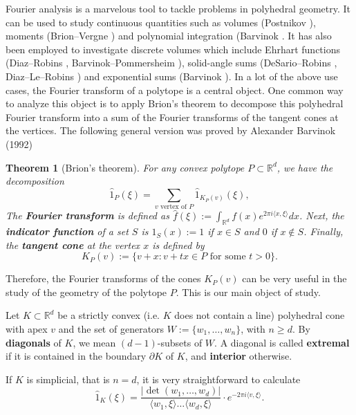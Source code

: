 \documentclass{article}
\newtheorem{thm}{Theorem}
\begin{document}
Fourier analysis is a marvelous tool to tackle problems in polyhedral geometry. It can be used to study continuous quantities such as volumes (Postnikov \cite{postnikov2009permutohedra}), moments (Brion--Vergne \cite{brion1997residue}) and polynomial integration (Barvinok \cite{barvinok1992exponential}. It has also been employed to investigate discrete volumes which include Ehrhart functions (Diaz--Robins \cite{diaz1997ehrhart}, Barvinok--Pommersheim \cite{barvinok1999algorithmic}), solid-angle sums (DeSario--Robins \cite{desario2011generalized}, Diaz--Le--Robins \cite{diaz1602fourier}) and exponential sums (Barvinok \cite{barvinok1993computing}). In a lot of the above use cases, the Fourier transform of a polytope is a central object. One common way to analyze this object is to apply Brion's theorem to decompose this polyhedral Fourier transform into a sum of the Fourier transforms of the tangent cones at the vertices. The following general version was proved by Alexander Barvinok (1992) \cite{barvinok1992exponential}
\begin{thm}[Brion's theorem]
	For any convex polytope $P \subset \mathbb{R}^d$, we have the decomposition
    \begin{equation}\label{eq:simplicial}
    	\hat{1}_P (\xi) = \sum_{v \text{ vertex of } P} \hat{1}_{K_P(v)} (\xi),
    \end{equation}
    The \textbf{Fourier transform} is defined as $\hat{f} (\xi) := \int_{\mathbb{R}^d} f(x) e^{2 \pi i \langle x, \xi \rangle} dx$. Next, the \textbf{indicator function} of a set $S$ is $1_S (x) := 1$ if $x \in S$ and $0$ if $x \notin S$. Finally, the \textbf{tangent cone} at the vertex $x$ is defined by
    \begin{equation}
    	K_P(v) := \{ v + x : v + tx \in P \text{ for some } t > 0 \}.
    \end{equation}
\end{thm}
Therefore, the Fourier transforms of the cones $K_P(v)$ can be very useful in the study of the geometry of the polytope $P$. This is our main object of study.

Let $K \subset \mathbb{R}^d$ be a strictly convex (i.e. $K$ does not contain a line) polyhedral cone with apex $v$ and the set of generators $W := \{w_1, \dots, w_n\}$, with $n \geq d$. By \textbf{diagonals} of $K$, we mean $(d-1)$-subsets of $W$. A diagonal is called \textbf{extremal} if it is contained in the boundary $\partial K$ of $K$, and \textbf{interior} otherwise.


If $K$ is simplicial, that is $n = d$, it is very straightforward to calculate
\begin{equation}
	\hat{1}_K (\xi) = \frac{|\det(w_1, \dots, w_d)|}{\langle w_1, \xi \rangle \dots \langle w_d, \xi \rangle} \cdot e^{-2 \pi i \langle v, \xi \rangle}.
\end{equation}
\end{document}
